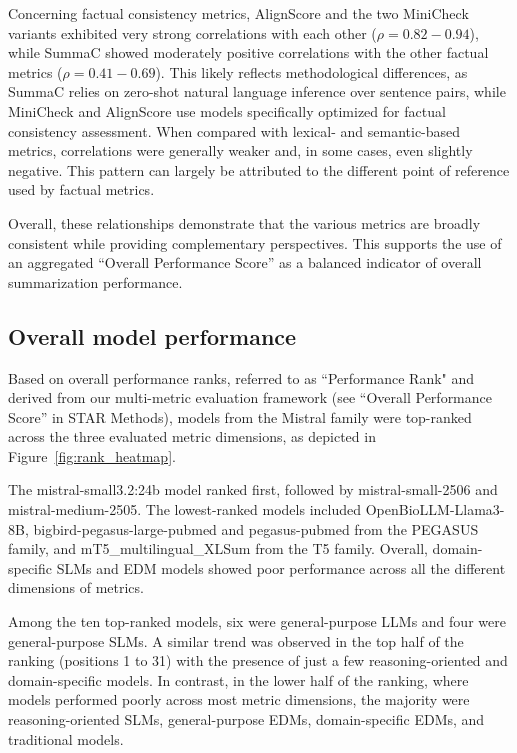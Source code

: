 Concerning factual consistency metrics, AlignScore and the two MiniCheck variants exhibited very strong correlations with each other ($\rho = 0.82 - 0.94$), while SummaC showed moderately positive correlations with the other factual metrics ($\rho = 0.41 -0.69$). This likely reflects methodological differences, as SummaC relies on zero-shot natural language inference over sentence pairs, while MiniCheck and AlignScore use models specifically optimized for factual consistency assessment. When compared with lexical- and semantic-based metrics, correlations were generally weaker and, in some cases, even slightly negative. This pattern can largely be attributed to the different point of reference used by factual metrics.

Overall, these relationships demonstrate that the various metrics are broadly consistent while providing complementary perspectives. This supports the use of an aggregated ``Overall Performance Score'' as a balanced indicator of overall summarization performance.

\subsection{Overall model performance}

Based on overall performance ranks, referred to as ``Performance Rank" and derived from our multi-metric evaluation framework (see ``Overall Performance Score'' in STAR Methods), models from the Mistral family were top-ranked across the three evaluated metric dimensions, as depicted in Figure~\ref{fig:rank_heatmap}. 

The mistral-small3.2:24b model ranked first, followed by mistral-small-2506 and mistral-medium-2505. The lowest-ranked models included OpenBioLLM-Llama3-8B, bigbird-pegasus-large-pubmed and pegasus-pubmed from the \ac{PEGASUS} family, and mT5\_multilingual\_XLSum from the \ac{T5} family. Overall, domain-specific \acp{SLM} and \ac{EDM} models showed poor performance across all the different dimensions of metrics.

Among the ten top-ranked models, six were general-purpose \acp{LLM} and four were general-purpose \acp{SLM}. A similar trend was observed in the top half of the ranking (positions 1 to 31) with the presence of just a few reasoning-oriented and domain-specific models. In contrast, in the lower half of the ranking, where models performed poorly across most metric dimensions, the majority were reasoning-oriented \acp{SLM}, general-purpose \acp{EDM}, domain-specific \acp{EDM}, and traditional models. 

